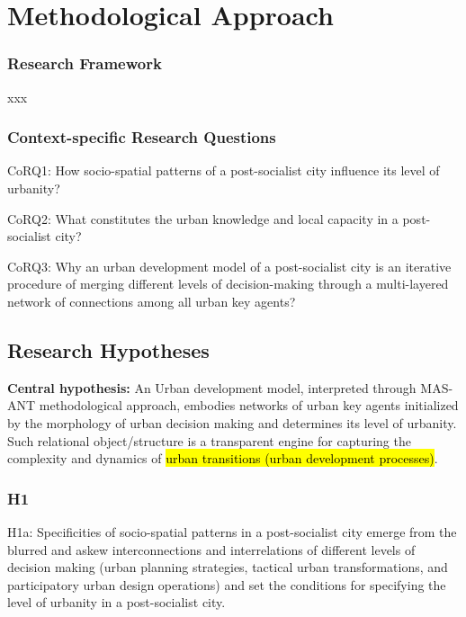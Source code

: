 \documentclass[11pt]{report}
\begin{document}
\chapter{Methodological Approach}


\subsection{Research Framework}

xxx

\subsection{Context-specific Research Questions}


CoRQ1: How socio-spatial patterns of a post-socialist city influence its level of urbanity?

CoRQ2: What constitutes the urban knowledge and local capacity in a post-socialist city?

CoRQ3: Why an urban development model of a post-socialist city is an iterative procedure of
merging different levels of decision-making through a multi-layered network of connections among all urban key agents?

\section{Research Hypotheses}
\textbf{Central hypothesis:} An Urban development model, interpreted through MAS-ANT methodological approach, embodies networks of urban key agents initialized by the morphology of urban decision making and determines its level of urbanity.
Such relational object/structure is a transparent engine for capturing the complexity and dynamics of \hl{urban transitions (urban development processes)}. 
\subsection{H1}

H1a: Specificities of socio-spatial patterns in a post-socialist city emerge from the blurred and askew interconnections and 
interrelations  of  different  levels  of  decision  making  (urban  planning  strategies,  tactical  urban  transformations,  and 
participatory urban design operations) and set the conditions for specifying the level of urbanity in a post-socialist city. 
\end{document}
